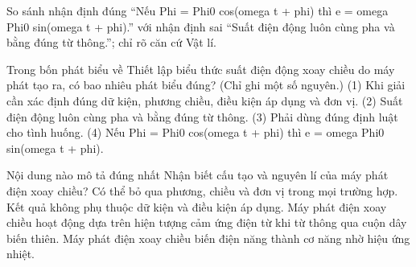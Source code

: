\begin{bt}
So sánh nhận định đúng “Nếu Phi = Phi0 cos(omega t + phi) thì e = omega Phi0 sin(omega t + phi).” với nhận định sai “Suất điện động luôn cùng pha và bằng đúng từ thông.”; chỉ rõ căn cứ Vật lí.
\end{bt}

\begin{ex}
Trong bốn phát biểu về Thiết lập biểu thức suất điện động xoay chiều do máy phát tạo ra, có bao nhiêu phát biểu đúng? (Chỉ ghi một số nguyên.) (1) Khi giải cần xác định đúng dữ kiện, phương chiều, điều kiện áp dụng và đơn vị. (2) Suất điện động luôn cùng pha và bằng đúng từ thông. (3) Phải dùng đúng định luật cho tình huống. (4) Nếu Phi = Phi0 cos(omega t + phi) thì e = omega Phi0 sin(omega t + phi).
\end{ex}

\begin{ex}
Nội dung nào mô tả đúng nhất Nhận biết cấu tạo và nguyên lí của máy phát điện xoay chiều?
\choice
{Có thể bỏ qua phương, chiều và đơn vị trong mọi trường hợp.}
{Kết quả không phụ thuộc dữ kiện và điều kiện áp dụng.}
{\True Máy phát điện xoay chiều hoạt động dựa trên hiện tượng cảm ứng điện từ khi từ thông qua cuộn dây biến thiên.}
{Máy phát điện xoay chiều biến điện năng thành cơ năng nhờ hiệu ứng nhiệt.}
\end{ex}

